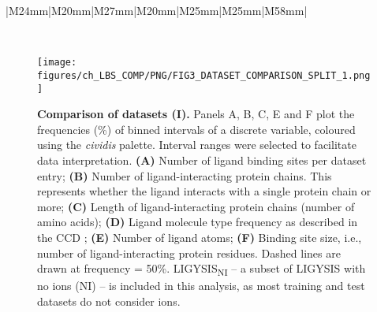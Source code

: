 \begin{landscape}
\begin{longtable}{|M{24mm}|M{20mm}|M{27mm}|M{20mm}|M{25mm}|M{25mm}|M{58mm}|}
\caption[Datasets summary statistics]{\textbf{Datasets summary statistics.} \# Structures, \# Sites and \# Ligands represent the number of PDB structures, ligand sites and total number of ligands for each dataset. For LIGYSIS and LIGYSIS\textsubscript{NI}, 3448 and 2775, are the number of structural segments, each represented by a single chain. For each segment, biologically relevant ligands across structures were considered: \textit{N} = 23,321 (LIGYSIS) and \textit{N} = 19,012 (LIGYSIS\textsubscript{NI}). The number of ligands is not equal to the number of sites for LIGYSIS and LIGYSIS\textsubscript{NI}, as ligands from multiple structures of the same protein are aggregated into unique sites. Overlap is the number of LIGYSIS binding sites represented by at least one protein-ligand complex for a given dataset. Percentage relative to LIGYSIS also reported. Methods represents the ligand site predictors that use these datasets for training or test. For \# Structures, \# Sites and \# Ligands, highest values are in bold font and lowest in italics. This is the other way around for Overlap (\%).}
\label{tab:datasets_comp}\\
\end{longtable}
\end{landscape}

\begin{figure}[htb!]
    \centering
    \texttt{[image: figures/ch\_LBS\_COMP/PNG/FIG3\_DATASET\_COMPARISON\_SPLIT\_1.png]}
    \caption[Comparison of datasets (I)]{\textbf{Comparison of datasets (I).} Panels A, B, C, E and F plot the frequencies (\%) of binned intervals of a discrete variable, coloured using the \textit{cividis} palette. Interval ranges were selected to facilitate data interpretation. \textbf{(A)} Number of ligand binding sites per dataset entry; \textbf{(B)} Number of ligand-interacting protein chains. This represents whether the ligand interacts with a single protein chain or more; \textbf{(C)} Length of ligand-interacting protein chains (number of amino acids); \textbf{(D)} Ligand molecule type frequency as described in the CCD \cite{WESTBROOK_2015_CCD}; \textbf{(E)} Number of ligand atoms; \textbf{(F)} Binding site size, i.e., number of ligand-interacting protein residues. Dashed lines are drawn at frequency = 50\%. LIGYSIS\textsubscript{NI} -- a subset of LIGYSIS with no ions (NI) -- is included in this analysis, as most training and test datasets do not consider ions.}
    \label{fig:dataset_comp_1}
\end{figure}

